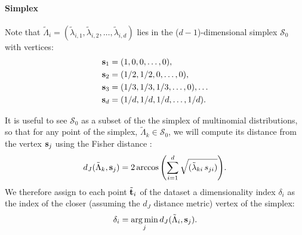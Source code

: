 \paragraph{Simplex}
Note that
$\tilde{\Lambda}_i = (\tilde{\lambda}_{i,1}, \tilde{\lambda}_{i,2},\dots,\tilde{\lambda}_{i,d})$
lies in the ($d-1$)-dimensional simplex $\mathcal{S}_0$ with vertices:
\begin{align*}
\boldsymbol{\mathbf{s}}_1 &= (1, 0, 0, \dots,0),\\
\boldsymbol{\mathbf{s}}_2 &= (1/2, 1/2, 0, \dots, 0),\\
\boldsymbol{\mathbf{s}}_3 &= (1/3, 1/3, 1/3, \dots, 0),\dots\\
\boldsymbol{\mathbf{s}}_d &= (1/d, 1/d, 1/d, \dots ,1/d).
\end{align*}


It is useful to see $\mathcal{S}_0$ as a subset of the the simplex of multinomial distributions, so that for any point of the simplex, $\tilde{\Lambda}_k \in \mathcal{S_0}$,
we will compute its distance from the vertex $\boldsymbol{\mathbf{s}}_j$ using the Fisher distance \citep{Lebanon:2005:RGS:1087529}:
\begin{equation}
	\label{eq:FishDist}
	d_J(\tilde{\Lambda}_k,\boldsymbol{\mathbf{s}}_j) = 2\arccos{\left(\sum_{i=1}^{d} \sqrt{(\tilde{\lambda}_{ki}\, s_{ji})}\right)}.
\end{equation}
We therefore assign to each point $\tilde{\boldsymbol{\mathbf{t}}}_i$ of the dataset a
dimensionality index $\delta_i$ as the index of the closer (assuming the $d_J$ distance metric) vertex of the simplex:
\begin{equation}\label{eq:idxHard}
	\delta_i = \operatorname*{arg\,min}_j d_J(\tilde{\Lambda}_i,\boldsymbol{\mathbf{s}}_j).
\end{equation}

